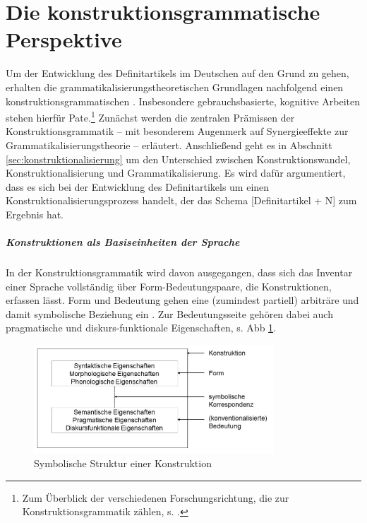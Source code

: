 \section{Die konstruktionsgrammatische Perspektive}\label{sec:kxg}
Um der Entwicklung des Definitartikels im Deutschen auf den Grund zu gehen, erhalten die grammatikalisierungstheoretischen Grundlagen nachfolgend einen konstruktionsgrammatischen . Insbesondere gebrauchsbasierte, kognitive  Arbeiten \parencite[u.a.][]{Langacker1987,Goldberg1995,Goldberg2006,Croft2002,Croft2004,Bybee2006,Bybee2010} stehen hierfür Pate.\footnote{Zum Überblick der verschiedenen Forschungsrichtung, die zur Konstruktionsgrammatik zählen, s. \textcite{Croft2004,Imo2007,Stefanowitsch2011,Hoffmann2013,Ziem2013}.} Zunächst werden die zentralen Prämissen der Konstruktionsgrammatik -- mit besonderem Augenmerk auf Synergieeffekte zur Grammatikalisierungstheorie -- erläutert. Anschließend geht es in Abschnitt \ref{sec:konstruktionalisierung} um den Unterschied zwischen Konstruktionswandel,  Konstruktionalisierung und Grammatikalisierung. Es wird dafür argumentiert, dass es sich bei der Entwicklung des Definitartikels um einen Konstruktionalisierungsprozess handelt, der das Schema [Definitartikel + N] zum Ergebnis hat.  


\subparagraph{Konstruktionen als Basiseinheiten der Sprache} 

In der Konstruktionsgrammatik wird davon ausgegangen, dass sich das Inventar einer Sprache vollständig über Form-Bedeutungspaare, die Konstruktionen, erfassen lässt. Form und Bedeutung gehen eine (zumindest partiell) arbiträre und damit symbolische Beziehung ein \parencite[257]{Croft2004}. Zur Bedeutungsseite gehören dabei auch pragmatische und diskurs-funktionale Eigenschaften, s. Abb \ref{abb:croft-construction}.  

\begin{figure}
\begin{center}
  \includegraphics[width=9cm]{images/croft-construction-neu.jpg}
\caption {Symbolische Struktur einer Konstruktion  \parencite[18]{Croft2002}}
\label{abb:croft-construction}
\end{center}
\end{figure} 

